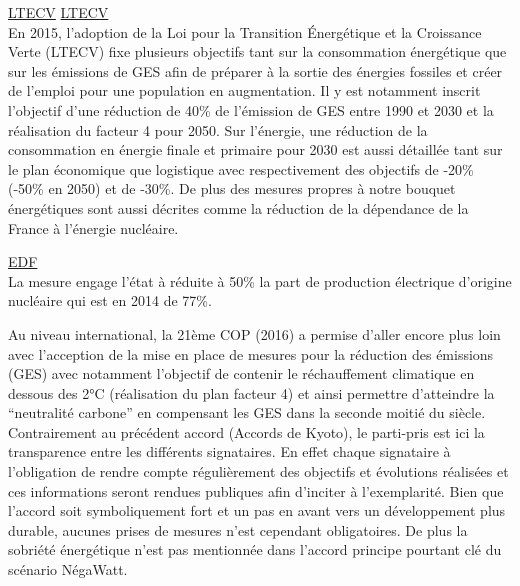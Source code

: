 \href{http://www.ecologique-solidaire.gouv.fr/loi-transition-energetique-croissance-verte}{LTECV}
\href{https://www.legifrance.gouv.fr/affichTexte.do?cidTexte=LEGITEXT000031742863&dateTexte=20170606}{LTECV}\\
En 2015, l’adoption de la Loi pour la Transition Énergétique et la Croissance
Verte (LTECV) fixe plusieurs objectifs tant sur la consommation énergétique
que sur les émissions de GES afin de préparer à la sortie des énergies fossiles
et créer de l’emploi pour une population en augmentation. Il y est notamment inscrit
l’objectif d’une réduction de 40\% de l’émission de GES entre 1990 et 2030 et la
réalisation du facteur 4 pour 2050. Sur l’énergie, une réduction de la consommation
en énergie finale et primaire pour 2030 est aussi détaillée tant sur le plan économique
que logistique avec respectivement des objectifs de -20\% (-50\% en 2050) et de -30\%.
De plus des mesures propres à notre bouquet énergétiques sont aussi décrites comme
la réduction de la dépendance de la France à l’énergie nucléaire.

\href{https://www.edf.fr/groupe-edf/espaces-dedies/l-energie-de-a-a-z/tout-sur-l-energie/produire-de-l-electricite/le-nucleaire-en-chiffres}{EDF}\\
La mesure engage l’état à réduite à 50\% la part de production électrique d’origine nucléaire
qui est en 2014 de 77\%.


Au niveau international, la 21ème COP (2016) a permise d’aller encore plus loin avec l’acception de la mise en place
de mesures pour la réduction des émissions (GES) avec notamment l’objectif
de contenir le réchauffement climatique en dessous des 2°C (réalisation du plan facteur 4) et ainsi permettre
d’atteindre la \enquote{neutralité carbone} en compensant les GES dans la seconde moitié
du siècle. Contrairement au précédent accord (Accords de Kyoto), le parti-pris est ici
la transparence entre les différents signataires. En effet chaque signataire à l’obligation de rendre
compte régulièrement des objectifs et évolutions réalisées et ces informations seront
rendues publiques afin d’inciter à l’exemplarité. Bien que l’accord soit symboliquement
fort et un pas en avant vers un développement plus durable, aucunes prises de mesures
n’est cependant obligatoires. De plus la sobriété énergétique n’est pas mentionnée dans l’accord
principe pourtant clé du scénario NégaWatt.

